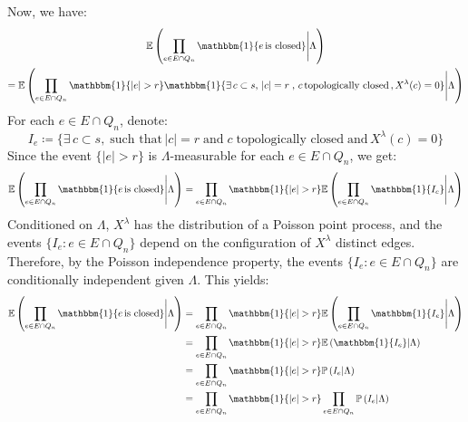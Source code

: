 \documentclass[10pt,a4paper]{amsart}
\theoremstyle{exampstyle}
\theoremstyle{exampnotations}
\begin{document}
Now, we have:
\begin{gather*}
\mathbb{E}\left( \prod_{e \in E \cap Q_n} \mathbbm{1} \lbrace e \, \text{is closed} \rbrace \Bigg\vert \Lambda \right) \\
=\mathbb{E}\left( \prod_{e \in E \cap Q_n} \mathbbm{1} \lbrace \vert e \vert > r \rbrace \mathbbm{1} \lbrace \exists  \, c \subset s, \, \vert c \vert = r \; , \, c  \, \text{topologically closed} \,  ,  X^{\lambda}(c) = 0 \rbrace \Bigg\vert \Lambda \right)
\end{gather*}
For each $e \in E \cap Q_n$, denote:
$$I_e \coloneqq \lbrace \exists \, c \subset s, \; \text{such that} \, \vert c \vert = r \; \text{and} \; c  \; \text{topologically closed} \; \text{and} \,  X^{\lambda}(c) = 0 \rbrace$$
Since the event $\lbrace \vert e \vert > r \rbrace$ is $\Lambda$-measurable for each $e \in E \cap Q_n$, we get:
\begin{equation*}
\mathbb{E}\left( \prod_{e \in E \cap Q_n} \mathbbm{1} \lbrace e \, \text{is closed} \rbrace \Bigg\vert \Lambda \right) = \prod_{e \in E \cap Q_n} \mathbbm{1} \lbrace \vert e \vert > r \rbrace \mathbb{E}\left( \prod_{e \in E \cap Q_n}  \mathbbm{1} \lbrace I_e \rbrace \Bigg\vert \Lambda \right)
\end{equation*}
Conditioned on $\Lambda$, $X^{\lambda}$ has the distribution of a Poisson point process, and the events $\lbrace I_e : e \in E \cap Q_n \rbrace$ depend on the configuration of $X^{\lambda}$ distinct edges. Therefore, by the Poisson independence property, the events $\lbrace I_e : e \in E \cap Q_n \rbrace$ are conditionally independent given $\Lambda$. This yields:
\begin{align}
\nonumber \mathbb{E}\left( \prod_{e \in E \cap Q_n} \mathbbm{1} \lbrace e \, \text{is closed} \rbrace \Bigg\vert \Lambda \right) &= \prod_{e \in E \cap Q_n} \mathbbm{1} \lbrace \vert e \vert > r \rbrace \mathbb{E}\left( \prod_{e \in E \cap Q_n}  \mathbbm{1} \lbrace I_e \rbrace \Bigg\vert \Lambda \right)
\\ \nonumber  &= \prod_{e \in E \cap Q_n} \mathbbm{1} \lbrace \vert e \vert > r \rbrace \mathbb{E}\left(  \mathbbm{1} \lbrace I_e \rbrace \vert \Lambda \right)
\\ \nonumber &= \prod_{e \in E \cap Q_n} \mathbbm{1} \lbrace \vert e \vert > r \rbrace \mathbb{P}\left(   I_e  \vert \Lambda \right)
\\ \label{eq16} &= \prod_{e \in E \cap Q_n} \mathbbm{1} \lbrace \vert e \vert > r \rbrace \prod_{e \in E \cap Q_n}\mathbb{P}\left(   I_e  \vert \Lambda \right)
\end{align}
\end{document}
